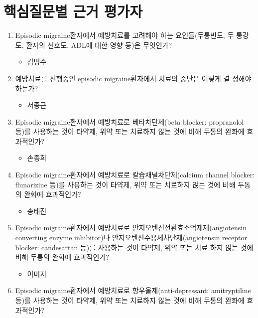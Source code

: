 \documentclass[]{book}
\providecommand{\tightlist}{%
  \setlength{\itemsep}{0pt}\setlength{\parskip}{0pt}}
\begin{document}
\hypertarget{section-24}{%
\section{핵심질문별 근거 평가자}\label{section-24}}

\begin{enumerate}
\def\labelenumi{\arabic{enumi}.}
\item
  Episodic migraine환자에서 예방치료를 고려해야 하는 요인들(두통빈도, 두 통강도, 환자의 선호도, ADL에 대한 영향 등)은 무엇인가?

  \begin{itemize}
  \tightlist
  \item
    김병수
  \end{itemize}
\item
  예방치료를 진행중인 episodic migraine환자에서 치료의 중단은 어떻게 결 정해야 하는가?

  \begin{itemize}
  \tightlist
  \item
    서종근
  \end{itemize}
\item
  Episodic migraine환자에서 예방치료로 베타차단제(beta blocker: propranolol 등)를 사용하는 것이 타약제, 위약 또는 치료하지 않는 것에 비해 두통의 완화에 효과적인가?

  \begin{itemize}
  \tightlist
  \item
    손종희
  \end{itemize}
\item
  Episodic migraine환자에서 예방치료로 칼슘채널차단제(calcium channel blocker: flunarizine 등)를 사용하는 것이 타약제, 위약 또는 치료하지 않는 것에 비해 두통의 완화에 효과적인가?

  \begin{itemize}
  \tightlist
  \item
    송태진
  \end{itemize}
\item
  Episodic migraine환자에서 예방치료로 안지오텐신전환효소억제제(angiotensin converting enzyme inhibitor)나 안지오텐신수용체차단제(angiotensin receptor blocker: candesartan 등)를 사용하는 것이 타약제, 위약 또는 치료 하지 않는 것에 비해 두통의 완화에 효과적인가?

  \begin{itemize}
  \tightlist
  \item
    이미지
  \end{itemize}
\item
  Episodic migraine환자에서 예방치료로 항우울제(anti-depressant: amitryptiline 등)를 사용하는 것이 타약제, 위약 또는 치료하지 않는 것에 비해 두통의 완화에 효과적인가?


\end{enumerate}
\end{document}

